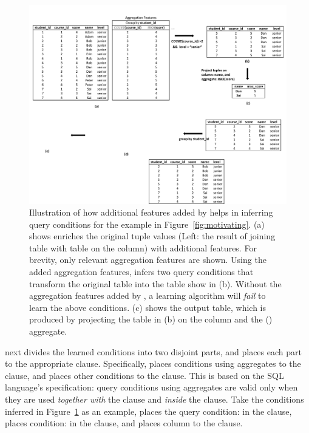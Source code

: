 \begin{figure}[t]
  \centering
  \includegraphics[scale=0.65]{fullexample}
  \vspace*{-3.0ex}\caption {{\label{fig:fullexample}
  Illustration of how additional features added by \ourtool
  helps in inferring query conditions for the example in Figure~\ref{fig:motivating}.
  (a) shows \ourtool
  enriches the original tuple values (Left: the
  result of joining table  with table
   on the  column)
  with additional features. For brevity, only relevant
  aggregation features are shown. Using the added aggregation
  features, \ourtool infers two query conditions that
  transform the original table into the table show in (b).
  Without the aggregation features added by
  \ourtool, a learning algorithm will \textit{fail} to learn the above conditions.
  (c) shows the output table, which is produced by projecting the
   table in (b)
  on the  column and the () aggregate.}}

\end{figure}


\ourtool next divides the learned conditions into two disjoint parts,
and places each part to the appropriate clause.
Specifically, \ourtool places conditions
using aggregates to the 
clause, and places other conditions to the  clause.
This is based on the SQL language's specification:
query conditions using aggregates are valid only when they
are used \textit{together with} the  clause
and \textit{inside} the  clause.
Take the conditions inferred in Figure~\ref{fig:fullexample}
as an example, \ourtool places the query
condition: 
in the  clause,
places condition: 
in the  clause, and places 
column  to the  clause.




